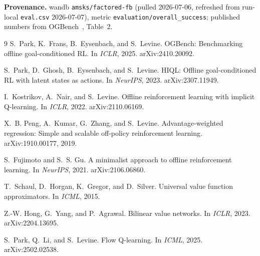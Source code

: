 \documentclass[11pt]{article}
\newcommand{\B}[1]{\textbf{#1}}
\begin{document}
\B{Provenance.} wandb \texttt{amsks/factored-fb} (pulled 2026-07-06, refreshed
from run-local \texttt{eval.csv} 2026-07-07), metric
\texttt{evaluation/overall\_success}; published numbers from
OGBench~\cite{park2025ogbench}, Table~2.

\begin{thebibliography}{9}
S.~Park, K.~Frans, B.~Eysenbach, and S.~Levine.
\newblock OGBench: Benchmarking offline goal-conditioned RL.
\newblock In \emph{ICLR}, 2025. arXiv:2410.20092.

S.~Park, D.~Ghosh, B.~Eysenbach, and S.~Levine.
\newblock HIQL: Offline goal-conditioned RL with latent states as actions.
\newblock In \emph{NeurIPS}, 2023. arXiv:2307.11949.

I.~Kostrikov, A.~Nair, and S.~Levine.
\newblock Offline reinforcement learning with implicit Q-learning.
\newblock In \emph{ICLR}, 2022. arXiv:2110.06169.

X.~B. Peng, A.~Kumar, G.~Zhang, and S.~Levine.
\newblock Advantage-weighted regression: Simple and scalable off-policy
reinforcement learning.
\newblock arXiv:1910.00177, 2019.

S.~Fujimoto and S.~S. Gu.
\newblock A minimalist approach to offline reinforcement learning.
\newblock In \emph{NeurIPS}, 2021. arXiv:2106.06860.

T.~Schaul, D.~Horgan, K.~Gregor, and D.~Silver.
\newblock Universal value function approximators.
\newblock In \emph{ICML}, 2015.

Z.-W. Hong, G.~Yang, and P.~Agrawal.
\newblock Bilinear value networks.
\newblock In \emph{ICLR}, 2023. arXiv:2204.13695.

S.~Park, Q.~Li, and S.~Levine.
\newblock Flow Q-learning.
\newblock In \emph{ICML}, 2025. arXiv:2502.02538.
\end{thebibliography}
\end{document}
